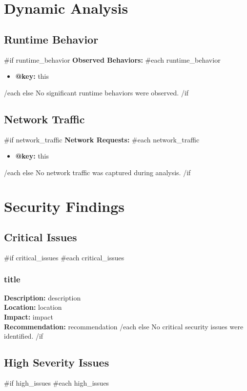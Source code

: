 \documentclass[11pt,a4paper]{article}
\begin{document}
\section{Dynamic Analysis}

\subsection{Runtime Behavior}
{{#if runtime_behavior}}
\textbf{Observed Behaviors:}
{{#each runtime_behavior}}
\begin{itemize}
    \item \textbf{{{@key}}:} {{this}}
\end{itemize}
{{/each}}
{{else}}
No significant runtime behaviors were observed.
{{/if}}

\subsection{Network Traffic}
{{#if network_traffic}}
\textbf{Network Requests:}
{{#each network_traffic}}
\begin{itemize}
    \item \textbf{{{@key}}:} {{this}}
\end{itemize}
{{/each}}
{{else}}
No network traffic was captured during analysis.
{{/if}}

\section{Security Findings}

\subsection{Critical Issues}
{{#if critical_issues}}
{{#each critical_issues}}
\subsubsection{{{title}}}
\textbf{Description:} {{description}} \\
\textbf{Location:} {{location}} \\
\textbf{Impact:} {{impact}} \\
\textbf{Recommendation:} {{recommendation}}
{{/each}}
{{else}}
No critical security issues were identified.
{{/if}}

\subsection{High Severity Issues}
{{#if high_issues}}
{{#each high_issues}}
\end{document}
